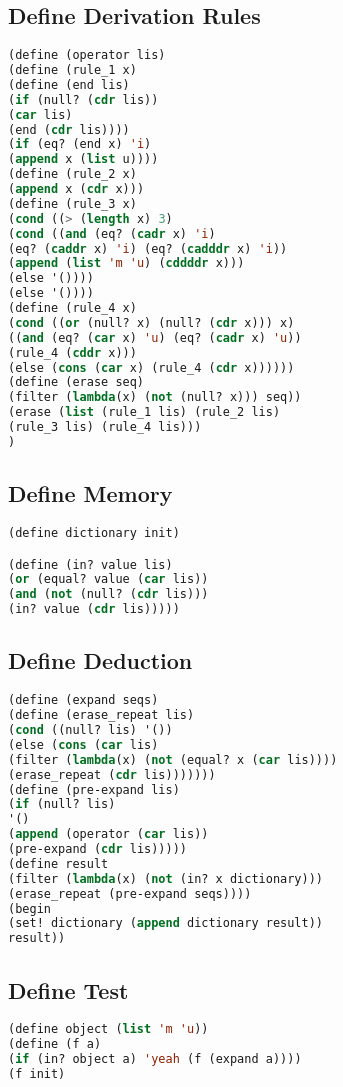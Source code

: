 \documentclass[11pt]{article}
\begin{document}
\subsection*{Define Derivation Rules}
\begin{lstlisting}[language=lisp]
(define (operator lis) 
(define (rule_1 x) 
(define (end lis) 
(if (null? (cdr lis)) 
(car lis) 
(end (cdr lis)))) 
(if (eq? (end x) 'i) 
(append x (list u)))) 
(define (rule_2 x) 
(append x (cdr x))) 
(define (rule_3 x) 
(cond ((> (length x) 3) 
(cond ((and (eq? (cadr x) 'i) 
(eq? (caddr x) 'i) (eq? (cadddr x) 'i))
(append (list 'm 'u) (cddddr x))) 
(else '()))) 
(else '()))) 
(define (rule_4 x) 
(cond ((or (null? x) (null? (cdr x))) x) 
((and (eq? (car x) 'u) (eq? (cadr x) 'u)) 
(rule_4 (cddr x))) 
(else (cons (car x) (rule_4 (cdr x)))))) 
(define (erase seq) 
(filter (lambda(x) (not (null? x))) seq)) 
(erase (list (rule_1 lis) (rule_2 lis) 
(rule_3 lis) (rule_4 lis))) 
) 
\end{lstlisting}
\subsection*{Define Memory}
\begin{lstlisting}[language=lisp]
(define dictionary init) 

(define (in? value lis) 
(or (equal? value (car lis)) 
(and (not (null? (cdr lis))) 
(in? value (cdr lis))))) 
\end{lstlisting}
\subsection*{Define Deduction}
\begin{lstlisting}[language=lisp]
(define (expand seqs) 
(define (erase_repeat lis) 
(cond ((null? lis) '()) 
(else (cons (car lis) 
(filter (lambda(x) (not (equal? x (car lis)))) 
(erase_repeat (cdr lis))))))) 
(define (pre-expand lis) 
(if (null? lis) 
'() 
(append (operator (car lis)) 
(pre-expand (cdr lis))))) 
(define result 
(filter (lambda(x) (not (in? x dictionary))) 
(erase_repeat (pre-expand seqs)))) 
(begin 
(set! dictionary (append dictionary result)) 
result)) 
\end{lstlisting}
\subsection*{Define Test}
\begin{lstlisting}[language=lisp]
(define object (list 'm 'u)) 
(define (f a) 
(if (in? object a) 'yeah (f (expand a)))) 
(f init) 
\end{lstlisting}
\end{document}
